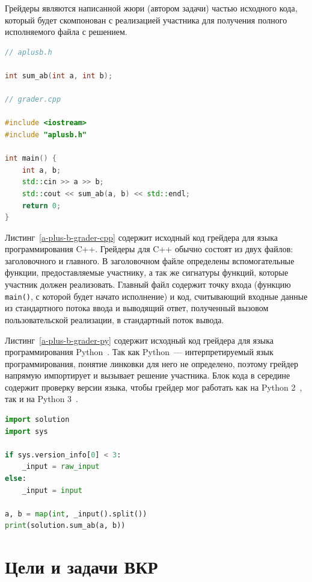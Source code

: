\documentclass[times,specification,annotation]{style/itmo-student-thesis/itmo-student-thesis}
\begin{document}
Грейдеры являются написанной жюри (автором задачи) частью исходного кода, который будет скомпонован с реализацией участника для получения полного исполняемого файла с решением.

\begin{lstlisting}[float=!h,caption={Пример грейдера для языка C++},label={a-plus-b-grader-cpp},language=c++]
// aplusb.h

int sum_ab(int a, int b);

// grader.cpp

#include <iostream>
#include "aplusb.h"
 
int main() {
    int a, b;
    std::cin >> a >> b;
    std::cout << sum_ab(a, b) << std::endl;
    return 0;
}
\end{lstlisting}

Листинг~\ref{a-plus-b-grader-cpp} содержит исходный код грейдера для языка программирования C++. Грейдеры для C++ обычно состоят из двух файлов: заголовочного и главного. В заголовочном файле определены вспомогательные функции, предоставляемые участнику, а так же сигнатуры функций, которые участник должен реализовать. Главный файл содержит точку входа (функцию \texttt{main()}, с которой будет начато исполнение) и код, считывающий входные данные из стандартного потока ввода и выводящий ответ, полученный вызовом пользовательской реализации, в стандартный поток вывода.

Листинг~\ref{a-plus-b-grader-py} содержит исходный код грейдера для языка программирования Python~\cite{python3docs}. Так как Python~--- интерпретируемый язык программирования, понятие линковки для него не определено, поэтому грейдер напрямую импортирует и вызывает решение участника. Блок кода в середине содержит проверку версии языка, чтобы грейдер мог работать как на Python 2~\cite{python2docs}, так и на Python 3~\cite{python3docs}.

\begin{lstlisting}[caption={Пример грейдера для языка Python},label={a-plus-b-grader-py},language=python]
import solution
import sys

if sys.version_info[0] < 3:
    _input = raw_input
else:
    _input = input
 
a, b = map(int, _input().split())
print(solution.sum_ab(a, b))
\end{lstlisting}

\section{Цели и задачи ВКР}
\end{document}
